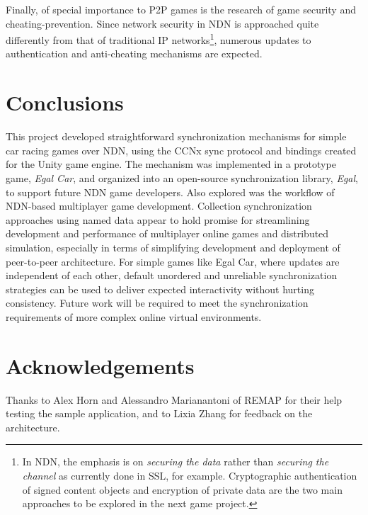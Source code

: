 \documentclass{article}
\begin{document}
Finally, of special importance to P2P games is the research of game security and cheating-prevention. Since network security in NDN is approached quite differently from that of traditional IP networks\footnote{In NDN, the emphasis is on \emph{securing the data} rather than \emph{securing the channel} as currently done in SSL, for example. Cryptographic authentication of signed content objects and encryption of private data are the two main approaches to be explored in the next game project.}, numerous updates to authentication and anti-cheating mechanisms are expected.


\section{Conclusions}
\label{conclusions}

This project developed straightforward synchronization mechanisms for simple car racing games over NDN, using the CCNx sync protocol and bindings created for the Unity game engine. The mechanism was implemented in a prototype game, \emph{Egal Car}, and organized into an open-source synchronization library, \emph{Egal}, to support future NDN game developers. Also explored was the workflow of NDN-based multiplayer game development. Collection synchronization approaches using named data appear to hold promise for streamlining development and performance of multiplayer online games and distributed simulation, especially in terms of simplifying development and deployment of peer-to-peer architecture.  For simple games like Egal Car, where updates are independent of each other, default unordered and unreliable synchronization strategies can be used to deliver expected interactivity without hurting consistency.   Future work will be required to meet the synchronization requirements of  more complex online virtual environments.   


\section{Acknowledgements}
\label{acknowledgements}

Thanks to Alex Horn and Alessandro Marianantoni of REMAP for their help testing the sample application, and to Lixia Zhang for feedback on the architecture.    



\end{document}
